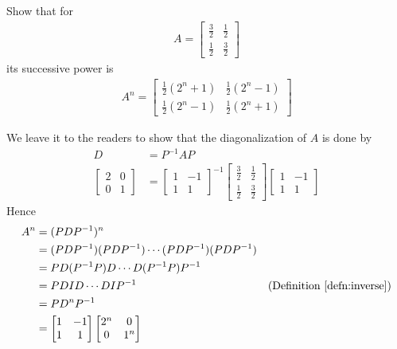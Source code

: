 \begin{exmp}
\label{exmp:powerdiag}
Show that for
\begin{align*}
A = 
\begin{bmatrix}
\frac{3}{2} & \frac{1}{2} \\
\frac{1}{2} & \frac{3}{2}
\end{bmatrix}
\end{align*}
its successive power is
\begin{align*}
A^n =
\begin{bmatrix}
\frac{1}{2}(2^n + 1) & \frac{1}{2}(2^n - 1) \\
\frac{1}{2}(2^n - 1) & \frac{1}{2}(2^n + 1)
\end{bmatrix}
\end{align*}
\end{exmp}
\begin{solution}
We leave it to the readers to show that the diagonalization of $A$ is done by
\begin{align*}
D &= P^{-1}AP \\
\begin{bmatrix}
2 & 0 \\
0 & 1
\end{bmatrix} &=
\begin{bmatrix}
1 & -1 \\
1 & 1
\end{bmatrix}^{-1}
\begin{bmatrix}
\frac{3}{2} & \frac{1}{2} \\
\frac{1}{2} & \frac{3}{2}
\end{bmatrix} 
\begin{bmatrix}
1 & -1 \\
1 & 1
\end{bmatrix}
\end{align*}
Hence
\begin{align*}
A^n &= (PDP^{-1})^n \\
&= (PDP^{-1})(PDP^{-1})\cdots(PDP^{-1})(PDP^{-1}) \\
&= PD(P^{-1}P)D\cdots D(P^{-1}P)P^{-1} \\
&= PDID \cdots DIP^{-1} & \text{(Definition \ref{defn:inverse})} \\
&= PD^nP^{-1} \\
&= \begin{bmatrix}
1 & -1 \\
1 & 1
\end{bmatrix}
\begin{bmatrix}
2^n & 0 \\
0 & 1^n
\end{bmatrix}

\end{align*}
\end{solution}
